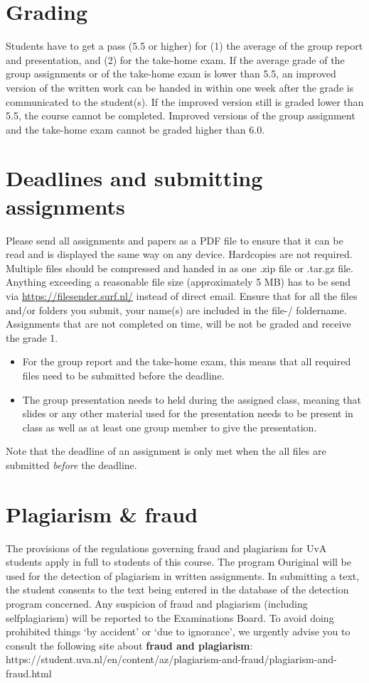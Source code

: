 \documentclass[a4paper,10pt,twocolumn]{report}
\begin{document}
	\section{Grading}
	Students have to get a pass (5.5 or higher) for (1) the average of the group report and presentation, and (2) for the take-home exam. If the average grade of the group assignments or of the take-home exam is lower than 5.5, an improved version of the written work can be handed in within one week after the grade is communicated to the student(s). If the improved version still is graded lower than 5.5, the course cannot be completed. Improved versions of the group assignment and the take-home exam cannot be graded higher than 6.0. 
	
	\section{Deadlines and submitting assignments}
	Please send all assignments and papers as a PDF file to ensure that it can be read and is displayed the same way on any device. Hardcopies are not required. Multiple files should be compressed and handed in as one .zip file or .tar.gz file. Anything exceeding a reasonable file size (approximately 5 MB) has to be send via \url{https://filesender.surf.nl/} instead of direct email. Ensure that for all the files and/or folders you submit, your name(s) are included in the file-/ foldername. \\
	
	Assignments that are not completed on time, will be not be graded and receive the grade 1. 
		\begin{itemize}
			\item For the group report and the take-home exam, this means that all required files need to be submitted before the deadline. 
			\item The group presentation needs to held during the assigned class, meaning that slides or any other material used for the presentation needs to be present in class as well as at least one group member to give the presentation. 
		\end{itemize}
	Note that the deadline of an assignment is only met when the all files are submitted \emph{before} the deadline.

	\section{Plagiarism \& fraud}
	The provisions of the regulations governing fraud and plagiarism for UvA students apply in full to students of this course. The program Ouriginal will be used for the detection of plagiarism in written assignments. In submitting a text, the student consents to the text being entered in the database of the detection program concerned. Any suspicion of fraud and plagiarism (including self\‐plagiarism) will be reported to the Examinations Board. To avoid doing prohibited things ‘by accident’ or ‘due to ignorance’, we urgently advise you to consult the following site about \textbf{fraud and plagiarism}: https://student.uva.nl/en/content/az/plagiarism-and-fraud/plagiarism-and-fraud.html
	
\end{document}
